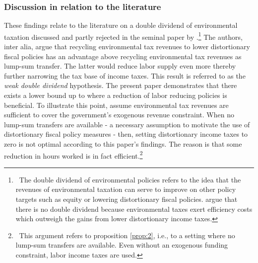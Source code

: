 \begin{comment}
\begin{prop}
Effect of using progressive income scheme on inequality (maybe as opposed to lump-sum transfers)
\end{prop}

content...
\end{comment}

\subsubsection{Discussion in relation to the literature}
These findings relate to the literature on a double dividend of environmental taxation discussed and partly rejected in the seminal paper by \cite{LansBovenberg1994EnvironmentalTaxation}.\footnote{ \ The double dividend of environmental policies refers to the idea that the revenues of environmental taxation can serve to improve on other policy targets such as equity or lowering distortionary fiscal policies. \cite{LansBovenberg1994EnvironmentalTaxation} argue that there is no double dividend because environmental taxes exert efficiency costs which outweigh the gains from lower distortionary income taxes. } The authors, inter alia, argue that recycling environmental tax revenues to lower distortionary fiscal policies has an advantage above recycling environmental tax revenues as lump-sum transfer. The latter would reduce labor supply even more thereby further narrowing the tax base of income taxes.  This result is referred to as the \textit{weak double dividend} hypothesis. The present paper demonstrates that there exists a lower bound up to where a reduction of labor reducing policies is beneficial. To illustrate this point, assume environmental tax revenues are sufficient to cover the government's exogenous revenue constraint. When no lump-sum transfers are available - a necessary assumption to motivate the use of distortionary fiscal policy measures - then, setting distortionary income taxes to zero is not optimal according to this paper's findings. The reason is that some reduction in hours worked is in fact efficient.\footnote{\ This argument refers to proposition \ref{prop:2}, i.e., to a setting where no lump-sum transfers are available. Even without an exogenous funding constraint, labor income taxes are used.}  %
  
